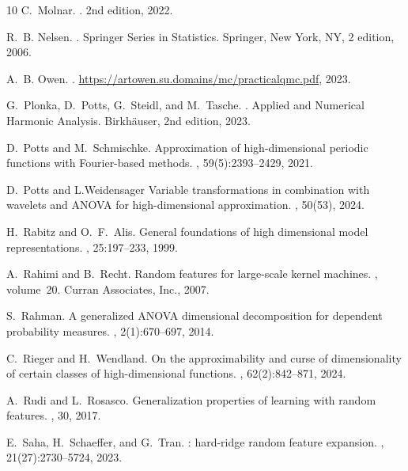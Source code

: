 \documentclass{article}
\theoremstyle{definition}
\numberwithin{equation}{section}
\begin{document}
\begin{thebibliography}{10}
C.~Molnar.
.
\newblock 2nd edition, 2022.

R.~B. Nelsen.
.
\newblock Springer Series in Statistics. Springer, New York, NY, 2 edition,
  2006.

A.~B. Owen.
.
\newblock \url{https://artowen.su.domains/mc/practicalqmc.pdf}, 2023.

G.~Plonka, D.~Potts, G.~Steidl, and M.~Tasche.
.
\newblock Applied and Numerical Harmonic Analysis. Birkh\"auser, 2nd edition,
  2023.

D.~Potts and M.~Schmischke.
\newblock Approximation of high-dimensional periodic functions with
  {F}ourier-based methods.
, 59(5):2393--2429, 2021.

D.~Potts and L.Weidensager
\newblock Variable transformations in combination with wavelets and {ANOVA} for
  high-dimensional approximation.
, 50(53), 2024.

H.~Rabitz and O.~F.~Alis.
\newblock General foundations of high dimensional model representations.
, 25:197--233, 1999.

A.~Rahimi and B.~Recht.
\newblock Random features for large-scale kernel machines.
, volume~20. Curran
  Associates, Inc., 2007.

S.~Rahman.
\newblock A generalized {ANOVA} dimensional decomposition for dependent
  probability measures.
, 2(1):670--697,
  2014.

C.~Rieger and H.~Wendland.
\newblock On the approximability and curse of dimensionality of certain classes
  of high-dimensional functions.
, 62(2):842--871, 2024.

A.~Rudi and L.~Rosasco.
\newblock Generalization properties of learning with random features.
, 30, 2017.

E.~Saha, H.~Schaeffer, and G.~Tran.
: hard-ridge random feature expansion.
, 21(27):2730--5724,
  2023.


\end{thebibliography}
\end{document}

